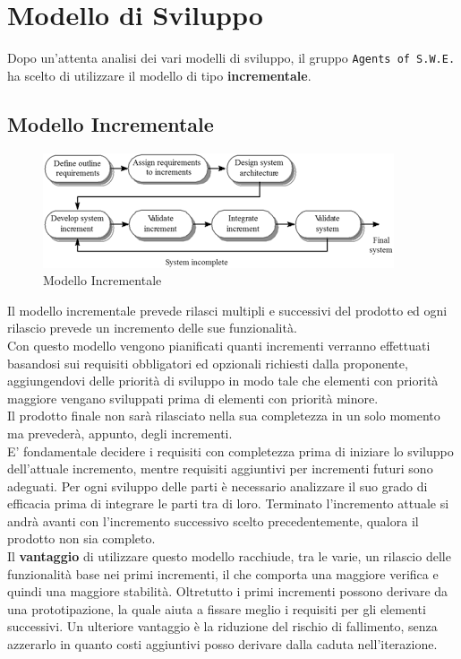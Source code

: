 \section{Modello di Sviluppo}
\label{ModelloSviluppo}

Dopo un'attenta analisi dei vari modelli di sviluppo, il gruppo \texttt{Agents of S.W.E.} ha scelto di utilizzare il modello di tipo \textbf{incrementale}.

\subsection{Modello Incrementale}

\begin{figure}[h]
	\centering
  		\includegraphics[width=0.7\linewidth]{./images/modelloincrementale.png}
  		\caption{Modello Incrementale}
  		\label{fig:Modello Incrementale}
\end{figure}

Il modello incrementale prevede rilasci multipli e successivi del prodotto ed ogni rilascio prevede un incremento delle sue funzionalità. \\
Con questo modello vengono pianificati quanti incrementi verranno effettuati basandosi sui requisiti obbligatori ed opzionali richiesti dalla proponente, aggiungendovi delle priorità di sviluppo in modo tale che elementi con priorità maggiore vengano sviluppati prima di elementi con priorità minore.\\
Il prodotto finale non sarà rilasciato nella sua completezza in un solo momento ma prevederà, appunto, degli incrementi. \\
E' fondamentale decidere i requisiti con completezza prima di iniziare lo sviluppo dell'attuale incremento, mentre requisiti aggiuntivi per incrementi futuri sono adeguati. Per ogni sviluppo delle parti è necessario analizzare il suo grado di efficacia prima di integrare le parti tra di loro. Terminato l'incremento attuale si andrà avanti con l'incremento successivo scelto precedentemente, qualora il prodotto non sia completo. \\
Il \textbf{vantaggio} di utilizzare questo modello racchiude, tra le varie, un rilascio delle funzionalità base nei primi incrementi, il che comporta una maggiore verifica e quindi una maggiore stabilità. Oltretutto i primi incrementi possono derivare da una prototipazione, la quale aiuta a fissare meglio i requisiti per gli elementi successivi. Un ulteriore vantaggio è la riduzione del rischio di fallimento, senza azzerarlo in quanto costi aggiuntivi posso derivare dalla caduta nell'iterazione\glossario.
